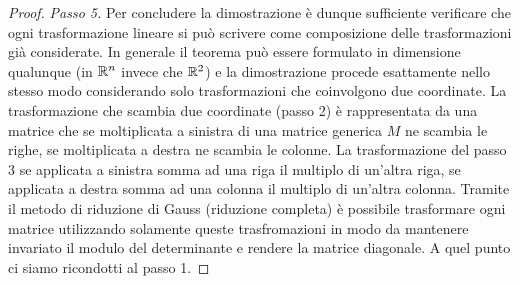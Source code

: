 \begin{proof}
\emph{Passo 5.}
Per concludere la dimostrazione è dunque sufficiente
verificare che ogni trasformazione lineare si può scrivere come composizione delle trasformazioni già considerate.
In generale il teorema può essere formulato in dimensione qualunque (in ${\mathbb R}^n$ invece che ${\mathbb R}^2$) 
e la dimostrazione procede esattamente nello stesso modo considerando solo trasformazioni che coinvolgono due coordinate. 
La trasformazione che scambia due coordinate (passo 2) è rappresentata da una matrice che se moltiplicata 
a sinistra di una matrice generica $M$ ne scambia le righe, se moltiplicata a destra ne scambia le colonne. 
La trasformazione del passo 3 se applicata a sinistra somma ad una riga il multiplo di un'altra riga, 
se applicata a destra somma ad una colonna il multiplo di un'altra colonna.
Tramite il metodo di riduzione di Gauss (riduzione completa) è possibile trasformare ogni matrice 
utilizzando solamente queste trasfromazioni in modo da mantenere invariato il modulo del determinante 
e rendere la matrice diagonale. A quel punto ci siamo ricondotti al passo 1.


\end{proof}
